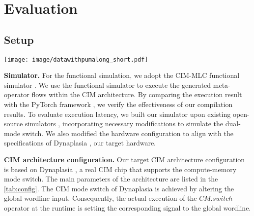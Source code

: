 \section{Evaluation}
\subsection{Setup}
\begin{figure*}[t]
    \centering
    \texttt{[image: image/datawithpumalong\_short.pdf]}
    \caption{ }
    \label{fig:data}
\end{figure*}


\noindent\textbf{Simulator.}
For the functional simulation, we adopt the CIM-MLC functional simulator \cite{qu2024cim}. We use the functional simulator to execute the generated meta-operator flows within the CIM architecture.
By comparing the execution result with the PyTorch framework \cite{paszke2019pytorch}, we verify the effectiveness of our compilation results.
To evaluate execution latency, we built our simulator upon existing open-source simulators \cite{chen2018neurosim,xia2017mnsim}, incorporating necessary modifications to simulate the dual-mode switch. We also modified the hardware configuration to align with the specifications of Dynaplasia \cite{kim202316}, our target hardware.


\noindent\textbf{CIM architecture configuration.}
Our target CIM architecture configuration is based on Dynaplasia \cite{kim202316}, a real CIM chip that supports the compute-memory mode switch. 
The main parameters of the architecture are listed in the \tab \ref{tab:config}. The CIM mode switch of Dynaplasia is achieved by altering the global wordline input.
Consequently, the actual execution of the $CM.switch$ operator at the runtime is setting the corresponding signal to the global wordline.  


